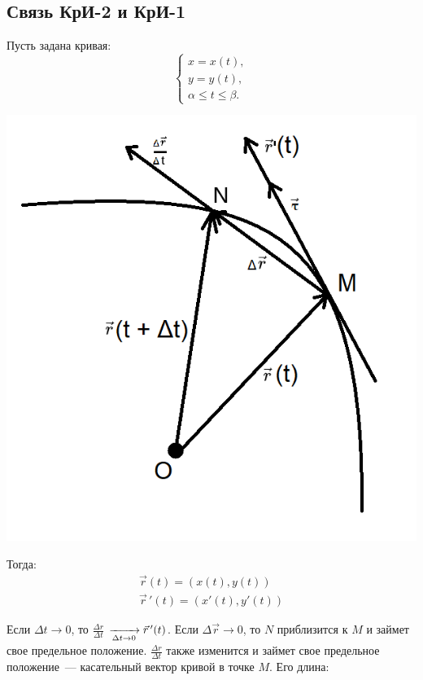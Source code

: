 \documentclass[../../main.tex]{subfiles}
\begin{document}
	\subsection{Связь КрИ-2 и КрИ-1}
	
	Пусть задана кривая:
	\[
	\begin{cases}
	x = x(t),\\
	y = y(t),\\
	\alpha \leq t \leq \beta.
	\end{cases}
	\]
	
	\begin{center}
		\includegraphics[scale = 0.8]{lec20_1.png}
	\end{center}
	
	Тогда:
	\begin{gather*}
	\vec r(t) = \left( x(t), y(t) \right) \\
	\vec r\,'(t) = \left( x'(t), y'(t) \right)
	\end{gather*}
	
	Если $\Delta t \to 0$, то $\frac{\Delta r}{\Delta t}$
	$ \xrightarrow[\Delta t \to 0]{}
	\vec{r}\,'(t)$.
	Если $\Delta \vec{r} \to 0$, то $N$ приблизится к $M$
	и займет свое предельное положение.
	$\frac{\Delta r}{\Delta t}$ также изменится и займет 
	свое предельное положение~--- касательный вектор кривой в точке $M$. Его 
	длина:
	
\end{document}
